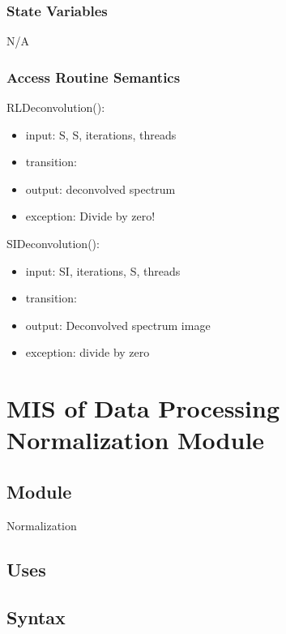 \documentclass[12pt, titlepage]{article}
\begin{document}
\subsubsection{State Variables}
N/A

\subsubsection{Access Routine Semantics}

\noindent RLDeconvolution():
\begin{itemize}
\item input: S, S, iterations, threads
\item transition:  
\item output: deconvolved spectrum
\item exception: Divide by zero!
\end{itemize}

\noindent SIDeconvolution():
\begin{itemize}
\item input: SI, iterations, S, threads
\item transition: 
\item output: Deconvolved spectrum image
\item exception: divide by zero
\end{itemize}

\section{MIS of Data Processing Normalization Module} \label{Mod:Normalization}

\subsection{Module}

Normalization

\subsection{Uses}


\subsection{Syntax}
\end{document}
